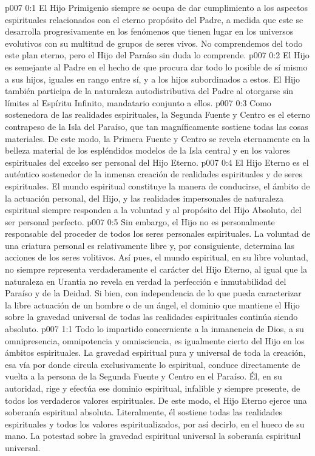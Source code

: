 \author{Consejero divino}
\vs p007 0:1 El Hijo Primigenio siempre se ocupa de dar cumplimiento a los aspectos espirituales relacionados con el eterno propósito del Padre, a medida que este se desarrolla progresivamente en los fenómenos que tienen lugar en los universos evolutivos con su multitud de grupos de seres vivos. No comprendemos del todo este plan eterno, pero el Hijo del Paraíso sin duda lo comprende.
\vs p007 0:2 El Hijo es semejante al Padre en el hecho de que procura dar todo lo posible de sí mismo a sus hijos, iguales en rango entre sí, y a los hijos subordinados a estos. El Hijo también participa de la naturaleza autodistributiva del Padre al otorgarse sin límites al Espíritu Infinito, mandatario conjunto a ellos.
\vs p007 0:3 \pc Como sostenedora de las realidades espirituales, la Segunda Fuente y Centro es el eterno contrapeso de la Isla del Paraíso, que tan magníficamente sostiene todas las cosas materiales. De este modo, la Primera Fuente y Centro se revela eternamente en la belleza material de los espléndidos modelos de la Isla central y en los valores espirituales del excelso ser personal del Hijo Eterno.
\vs p007 0:4 \pc El Hijo Eterno es el auténtico sostenedor de la inmensa creación de realidades espirituales y de seres espirituales. El mundo espiritual constituye la manera de conducirse, el ámbito de la actuación personal, del Hijo, y las realidades impersonales de naturaleza espiritual siempre responden a la voluntad y al propósito del Hijo Absoluto, del ser personal perfecto.
\vs p007 0:5 Sin embargo, el Hijo no es personalmente responsable del proceder de todos los seres personales espirituales. La voluntad de una criatura personal es relativamente libre y, por consiguiente, determina las acciones de los seres volitivos. Así pues, el mundo espiritual, en su libre voluntad, no siempre representa verdaderamente el carácter del Hijo Eterno, al igual que la naturaleza en Urantia no revela en verdad la perfección e inmutabilidad del Paraíso y de la Deidad. Si bien, con independencia de lo que pueda caracterizar la libre actuación de un hombre o de un ángel, el dominio que mantiene el Hijo sobre la gravedad universal de todas las realidades espirituales continúa siendo absoluto.
\vs p007 1:1 Todo lo impartido concerniente a la inmanencia de Dios, a su omnipresencia, omnipotencia y omnisciencia, es igualmente cierto del Hijo en los ámbitos espirituales. La gravedad espiritual pura y universal de toda la creación, esa vía por donde circula exclusivamente lo espiritual, conduce directamente de vuelta a la persona de la Segunda Fuente y Centro en el Paraíso. Él, en su autoridad, rige y efectúa ese dominio espiritual, infalible y siempre presente, de todos los verdaderos valores espirituales. De este modo, el Hijo Eterno ejerce una soberanía espiritual absoluta. Literalmente, él sostiene todas las realidades espirituales y todos los valores espiritualizados, por así decirlo, en el hueco de su mano. La potestad sobre la gravedad espiritual universal  la soberanía espiritual universal.
